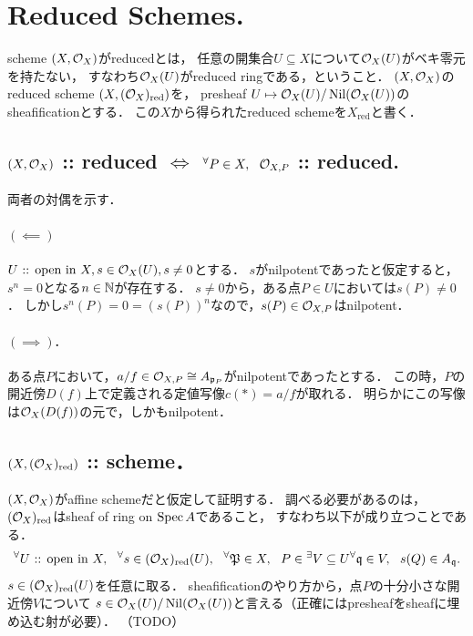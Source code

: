 \documentclass[a4paper]{jsarticle}
\newcommand{\red}[1]{#1_{\text{red}}}
\begin{document}
\section{Reduced Schemes.} %
    scheme $(X, \mathcal{O}_X)$がreducedとは，
    任意の開集合$U \subseteq X$について$\mathcal{O}_X(U)$がベキ零元を持たない，
    すなわち$\mathcal{O}_X(U)$がreduced ringである，ということ．
    $(X, \mathcal{O}_X)$のreduced scheme $(X, \red{(\shO_X)})$を，
    presheaf $U \mapsto \mathcal{O}_X(U)/\operatorname{Nil}(\mathcal{O}_X(U))$のsheafificationとする．
    この$X$から得られたreduced schemeを$\red{X}$と書く．

    \subsection{$(X, \mathcal{O}_X)$ :: reduced $\iff$ ${}^{\forall} P \in X,~~ \mathcal{O}_{X,P}$ :: reduced.}
    両者の対偶を示す．
    \paragraph{$(\impliedby)$}
    $U \text{ :: open in } X, s \in \mathcal{O}_X(U), s \neq 0$とする．
    $s$がnilpotentであったと仮定すると，$s^n=0$となる$n \in \mathbb{N}$が存在する．
    $s \neq 0$から，ある点$P \in U$においては$s(P) \neq 0$．
    しかし$s^n(P)=0=(s(P))^n$なので，$s(P) \in \mathcal{O}_{X, P}$はnilpotent．

    \paragraph{$(\implies)$.}
    ある点$P$において，$a/f \in \mathcal{O}_{X,P} \cong A_{\mathfrak{p}_P}$がnilpotentであったとする．
    この時，$P$の開近傍$D(f)$上で定義される定値写像$c(*)=a/f$が取れる．
    明らかにこの写像は$\mathcal{O}_X(D(f))$の元で，しかもnilpotent．

    \subsection{$(X, \red{(\shO_X)})$ :: scheme．}
    $(X, \mathcal{O}_X)$がaffine schemeだと仮定して証明する．
    調べる必要があるのは，$\red{(\shO_X)}$はsheaf of ring on $\operatorname{Spec} A$であること，
    すなわち以下が成り立つことである．
    \[
        \Forall{U \OpenIn X} \Forall{s \in \red{(\shO_X)}(U)}
        \Forall{\I{P} \in X} P \in {}^{\exists} V \subseteq U \Forall{\I{q} \in V}
        s(Q) \in A_{\I{q}}.
    \]
    $s \in \red{(\shO_X)}(U)$を任意に取る．
    sheafificationのやり方から，点$P$の十分小さな開近傍$V$について
    $s \in \mathcal{O}_X(U)/\operatorname{Nil}(\mathcal{O}_X(U))$と言える（正確にはpresheafをsheafに埋め込む射が必要）．
    （TODO）
\end{document}
